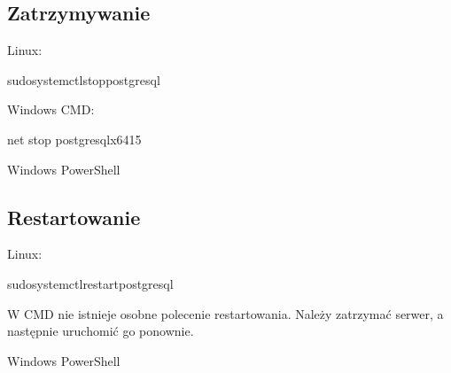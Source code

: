 \documentclass[a4paper,11pt,polish]{sphinxmanual}
\begin{document}
\subsection{Zatrzymywanie}
\label{\detokenize{Kontrola_i_konserwacja/kontrola_i_konserwacja:zatrzymywanie}}
\sphinxAtStartPar
Linux:

\begin{sphinxVerbatim}[commandchars=\\\{\}]
sudosystemctlstoppostgresql
\end{sphinxVerbatim}

\sphinxAtStartPar
Windows CMD:

\begin{sphinxVerbatim}[commandchars=\\\{\}]
net stop postgresql\PYGZhy{}x64\PYGZhy{}15
\end{sphinxVerbatim}

\sphinxAtStartPar
Windows PowerShell

\begin{sphinxVerbatim}[commandchars=\\\{\}]
  
\end{sphinxVerbatim}


\subsection{Restartowanie}
\label{\detokenize{Kontrola_i_konserwacja/kontrola_i_konserwacja:restartowanie}}
\sphinxAtStartPar
Linux:

\begin{sphinxVerbatim}[commandchars=\\\{\}]
sudosystemctlrestartpostgresql
\end{sphinxVerbatim}

\sphinxAtStartPar
W CMD nie istnieje osobne polecenie restartowania. Należy zatrzymać serwer, a następnie uruchomić go ponownie.

\sphinxAtStartPar
Windows PowerShell

\begin{sphinxVerbatim}[commandchars=\\\{\}]
  
\end{sphinxVerbatim}
\end{document}
